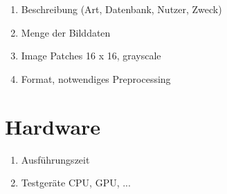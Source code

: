 \begin{enumerate}
	\item Beschreibung (Art, Datenbank, Nutzer, Zweck)
	\item Menge der Bilddaten
	\item Image Patches 16 x 16, grayscale
	\item Format, notwendiges Preprocessing
\end{enumerate}

\section{Hardware}

\begin{enumerate}
	\item Ausführungszeit
	\item Testgeräte CPU, GPU, ...
\end{enumerate}
